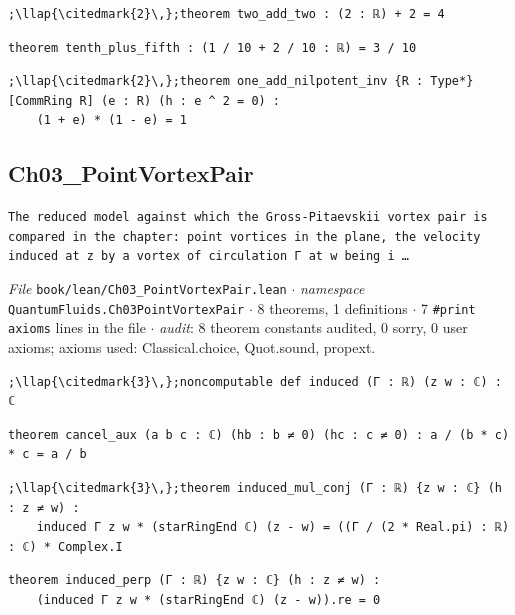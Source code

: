 \begin{lstlisting}[style=leancat]
;\llap{\citedmark{2}\,};theorem two_add_two : (2 : ℝ) + 2 = 4
\end{lstlisting}

\begin{lstlisting}[style=leancat]
theorem tenth_plus_fifth : (1 / 10 + 2 / 10 : ℝ) = 3 / 10
\end{lstlisting}

\begin{lstlisting}[style=leancat]
;\llap{\citedmark{2}\,};theorem one_add_nilpotent_inv {R : Type*} [CommRing R] (e : R) (h : e ^ 2 = 0) :
    (1 + e) * (1 - e) = 1
\end{lstlisting}

\subsection{Ch03\_\allowbreak{}PointVortexPair}
{\footnotesize\raggedright\texttt{The reduced model against which the Gross-\allowbreak{}Pitaevskii vortex pair is compared in the chapter: point vortices in the plane,\allowbreak{} the velocity induced at z by a vortex of circulation Γ at w being i …}\par}
{\footnotesize\raggedright\emph{File} \texttt{book/lean/Ch03\_\allowbreak{}PointVortexPair.\allowbreak{}lean} $\cdot$ \emph{namespace} \texttt{QuantumFluids.\allowbreak{}Ch03PointVortexPair} $\cdot$ 8 theorems, 1 definitions $\cdot$ 7 \texttt{\#print axioms} lines in the file $\cdot$ \emph{audit}: 8 theorem constants audited, 0 sorry, 0 user axioms; axioms used: Classical.choice, Quot.sound, propext.\par}
\begin{lstlisting}[style=leancat]
;\llap{\citedmark{3}\,};noncomputable def induced (Γ : ℝ) (z w : ℂ) : ℂ
\end{lstlisting}

\begin{lstlisting}[style=leancat]
theorem cancel_aux (a b c : ℂ) (hb : b ≠ 0) (hc : c ≠ 0) : a / (b * c) * c = a / b
\end{lstlisting}

\begin{lstlisting}[style=leancat]
;\llap{\citedmark{3}\,};theorem induced_mul_conj (Γ : ℝ) {z w : ℂ} (h : z ≠ w) :
    induced Γ z w * (starRingEnd ℂ) (z - w) = ((Γ / (2 * Real.pi) : ℝ) : ℂ) * Complex.I
\end{lstlisting}

\begin{lstlisting}[style=leancat]
theorem induced_perp (Γ : ℝ) {z w : ℂ} (h : z ≠ w) :
    (induced Γ z w * (starRingEnd ℂ) (z - w)).re = 0
\end{lstlisting}

